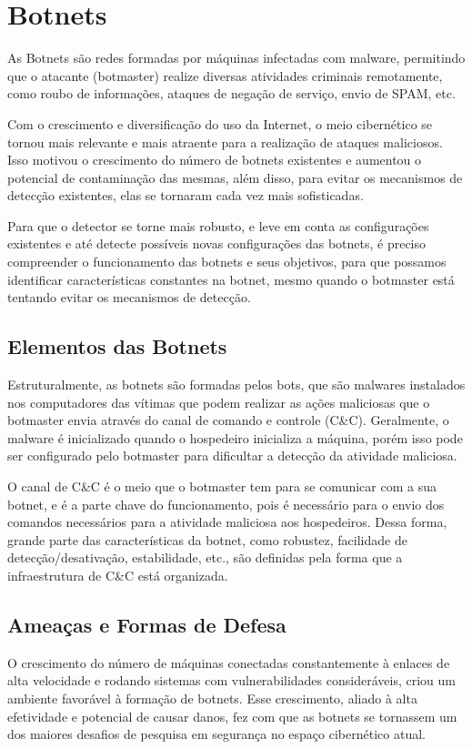 \chapter{Botnets}
As Botnets são redes formadas por máquinas infectadas com malware, permitindo que o atacante (botmaster) realize diversas atividades criminais remotamente, como roubo de informações, ataques de negação de serviço, envio de SPAM, etc.\cite{silva2013botnets}

Com o crescimento e diversificação do uso da Internet, o meio cibernético se tornou mais relevante e mais atraente para a realização de ataques maliciosos. Isso motivou o crescimento do número de botnets existentes e aumentou o potencial de contaminação das mesmas, além disso, para evitar os mecanismos de detecção existentes, elas se tornaram cada vez mais sofisticadas.

Para que o detector se torne mais robusto, e leve em conta as configurações existentes e até detecte possíveis novas configurações das botnets, é preciso compreender o funcionamento das botnets e seus objetivos, para que possamos identificar características constantes na botnet, mesmo quando o botmaster está tentando evitar os mecanismos de detecção.

\section{Elementos das Botnets}
Estruturalmente, as botnets são formadas pelos bots, que são malwares instalados nos computadores das vítimas que podem realizar as ações maliciosas que o botmaster envia através do canal de comando e controle (C\&C). Geralmente, o malware é inicializado quando o hospedeiro inicializa a máquina, porém isso pode ser configurado pelo botmaster para dificultar a detecção da atividade maliciosa.

O canal de C\&C é o meio que o botmaster tem para se comunicar com a sua botnet, e é a parte chave do funcionamento, pois é necessário para o envio dos comandos necessários para a atividade maliciosa aos hospedeiros. Dessa forma, grande parte das características da botnet, como robustez, facilidade de detecção/desativação, estabilidade, etc., são definidas pela forma que a infraestrutura de C\&C está organizada.

\section{Ameaças e Formas de Defesa}
O crescimento do número de máquinas conectadas constantemente à enlaces de alta velocidade e rodando sistemas com vulnerabilidades consideráveis, criou um ambiente favorável à formação de botnets. Esse crescimento, aliado à alta efetividade e potencial de causar danos, fez com que as botnets se tornassem um dos maiores desafios de pesquisa em segurança no espaço cibernético atual. \cite{soltani2014survey}

